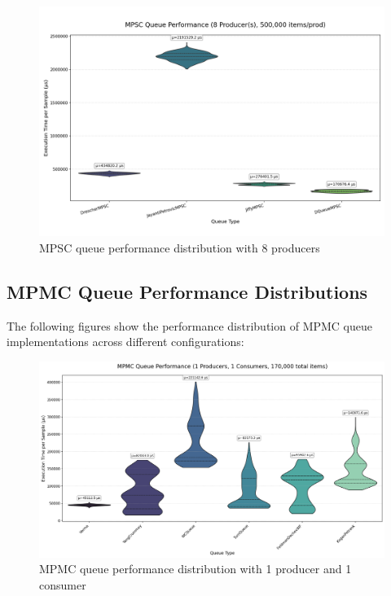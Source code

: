 \begin{figure}[H]
\centering
\caption{MPSC queue performance distribution with 8 producers}
\label{fig:mpsc-violin-8p}
\includegraphics[width=\textwidth]{images/results/mpsc_performance_violin_8_producers.png}
\end{figure}

\subsection{MPMC Queue Performance Distributions}
The following figures show the performance distribution of MPMC queue implementations across different configurations:

\begin{figure}[H]
\centering
\caption{MPMC queue performance distribution with 1 producer and 1 consumer}
\label{fig:mpmc-violin-1p1c}
\includegraphics[width=\textwidth]{images/results/mpmc_performance_violin_1P_1C.png}
\end{figure}

